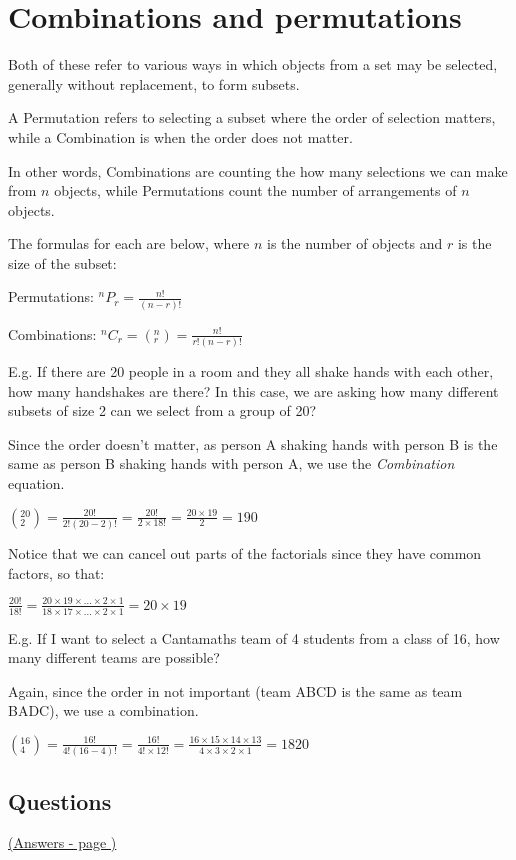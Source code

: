 \documentclass[../main.tex]{subfiles}
\begin{document}
\section{Combinations and permutations}
Both of these refer to various ways in which objects from a set may be selected, generally without replacement, to form subsets.

A Permutation refers to selecting a subset where the order of selection matters, while a Combination is when the order does not matter.

In other words, Combinations are counting the how many selections we can make from \(n\) objects, while Permutations count the number of arrangements of \(n\) objects.

The formulas for each are below, where \(n\) is the number of objects and \(r\) is the size of the subset:

Permutations: \(^nP_r=\frac{n!}{(n-r)!}\)

Combinations: \(^nC_r=(_r^n)=\frac{n!}{r!(n-r)!}\)

\noindent E.g. If there are 20 people in a room and they all shake hands with each other, how many handshakes are there?
In this case, we are asking how many different subsets of size 2 can we select from a group of 20?

Since the order doesn't matter, as person A shaking hands with person B is the same as person B shaking hands with person A, we use the \textit{Combination} equation.

\((_2^{20})=\frac{20!}{2!(20-2)!}=\frac{20!}{2\times 18!}=\frac{20\times19}{2}=190\)

Notice that we can cancel out parts of the factorials since they have common factors, so that:

\(\frac{20!}{18!}=\frac{20\times 19\times ... \times 2 \times 1}{18 \times 17 \times ... \times 2 \times 1} = 20 \times 19\)

E.g. If I want to select a Cantamaths team of 4 students from a class of 16, how many different teams are possible?

Again, since the order in not important (team ABCD is the same as team BADC), we use a combination.

\((_4^{16})=\frac{16!}{4!(16-4)!}=\frac{16!}{4!\times 12!}=\frac{16\times 15\times 14\times 13}{4\times 3\times 2\times 1}=1820\)
\pagebreak
\hypertarget{combinationslink}{\subsection*{Questions}}
\hyperlink{combinationsanswers}{(Answers - page {\pageref*{Combinations answers}})}
\end{document}
